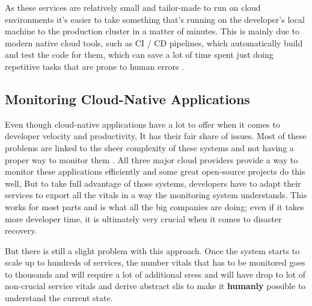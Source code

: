 As these services are relatively small and tailor-made to run on cloud environments it's easier to take something that's running on the developer's local machine to the production cluster in a matter of minutes. This is mainly due to modern native cloud tools, such as CI / CD pipelines, which automatically build and test the code for them, which can save a lot of time spent just doing repetitive tasks that are prone to human errors \citep{Whataret68:online}.

\subsection{Monitoring Cloud-Native Applications} \label{monitoring-bg}
Even though cloud-native applications have a lot to offer when it comes to developer velocity and productivity, It has their fair share of issues. Most of these problems are linked to the sheer complexity of these systems and not having a proper way to monitor them \citep{5WaysYou35:online}. All three major cloud providers provide a way to monitor these applications efficiently and some great open-source projects do this well, But to take full advantage of those systems, developers have to adapt their services to export all the vitals in a way the monitoring system understands. This works for most parts and is what all the big companies are doing; even if it takes more developer time, it is ultimately very crucial when it comes to disaster recovery.

But there is still a slight problem with this approach. Once the system starts to scale up to hundreds of services, the number vitals that has to be monitored goes to thousands and will require a lot of additional \acp{sres} and will have drop to lot of non-crucial service vitals and derive abstract \acp{sli} to make it \textbf{humanly} possible to understand the current state.\\
